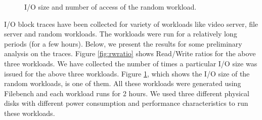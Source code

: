 \begin{figure}[ht]
\begin{centering}
\caption{I/O size and number of access of the random workload.}
\label{fig:randomiosize}
\end{centering}
\end{figure}

I/O block traces have been collected for variety of workloads like
video server, file server and random workloads. The workloads were run
for a relatively long periods (for a few hours). Below, we present the
results for some preliminary analysis on the traces. Figure
\ref{fig:rwratio} shows Read/Write ratios for the above three
workloads.  We have collected the number of times a particular I/O
size was issued for the above three workloads. Figure
\ref{fig:randomiosize}, which shows the I/O size of the random
workloads, is one of them. All these workloads were generated using
Filebench and each workload runs for 2 hours. We used three different
physical disks with different power consumption and performance
characteristics to run these workloads. 

